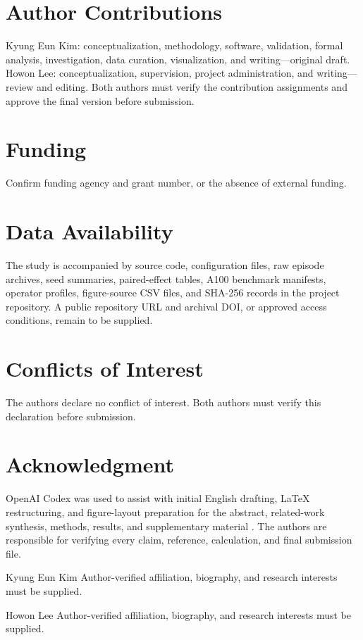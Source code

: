 \documentclass{ieeeaccess}
\newcommand{\AuthorCheck}[1]{\textcolor{ReviewBlue}{#1}}
\begin{document}
\section*{Author Contributions}
Kyung Eun Kim: conceptualization, methodology, software, validation, formal analysis, investigation, data curation, visualization, and writing---original draft. Howon Lee: conceptualization, supervision, project administration, and writing---review and editing. \AuthorCheck{Both authors must verify the contribution assignments and approve the final version before submission.}

\section*{Funding}
\AuthorCheck{Confirm funding agency and grant number, or the absence of external funding.}

\section*{Data Availability}
The study is accompanied by source code, configuration files, raw episode archives, seed summaries, paired-effect tables, A100 benchmark manifests, operator profiles, figure-source CSV files, and SHA-256 records in the project repository. \AuthorCheck{A public repository URL and archival DOI, or approved access conditions, remain to be supplied.}

\section*{Conflicts of Interest}
The authors declare no conflict of interest. \AuthorCheck{Both authors must verify this declaration before submission.}

\section*{Acknowledgment}
OpenAI Codex was used to assist with initial English drafting, LaTeX restructuring, and figure-layout preparation for the abstract, related-work synthesis, methods, results, and supplementary material \cite{openai2026codex}.  The authors are responsible for verifying every claim, reference, calculation, and final submission file.




\begin{IEEEbiographynophoto}{Kyung Eun Kim}
\AuthorCheck{Author-verified affiliation, biography, and research interests must be supplied.}
\end{IEEEbiographynophoto}

\begin{IEEEbiographynophoto}{Howon Lee}
\AuthorCheck{Author-verified affiliation, biography, and research interests must be supplied.}
\end{IEEEbiographynophoto}

\EOD
\end{document}
